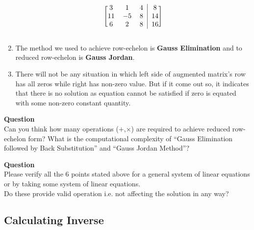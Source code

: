\documentclass{article}
\begin{document}
\begin{enumerate}
\[\begin{blockarray}{cccc}
\begin{block}{[ccc|c]}
        3 & 1 & 4 & 8 \\
        11 & -5 & 8 & 14\\
        6 & 2 & 8 & 16 \\
        \end{block}
        \end{blockarray}
        \]
\item The method we used to achieve row-echelon is \textbf{Gauss Elimination} and to reduced row-echelon is \textbf{Gauss Jordan}.
\item There will not be any situation in which left side of augmented matrix's row has all zeros while right has non-zero value. But if it come out so, it indicates that there is no solution as equation cannot be satisfied if zero is equated with some non-zero constant quantity.
 \end{enumerate}  
 
\textbf{Question}\\
Can you think how many operations ($+$,$\times$) are required to achieve reduced row-echelon form? What is the computational complexity of ``Gauss Elimination followed by Back Substitution'' and ``Gauss Jordan Method''? 

\textbf{Question}\\
Please verify all the 6 points stated above for a general system of linear equations or by taking some system of linear equations.\\
Do these provide valid operation i.e. not affecting the solution in any way?\\

\subsection{Calculating Inverse}
\end{document}
